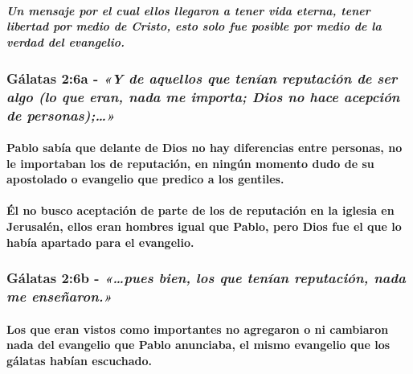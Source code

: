\documentclass[11a pt,twoside]{article}
\newcommand{\scripture}[1]{%
  {\fontsize{12pt}{16pt}\selectfont\ScriptureFont\itshape #1}%
}
\let\oldsubsubsection\subsubsection
\renewcommand{\subsubsection}{\needspace{4\baselineskip}\oldsubsubsection}
\let\oldparagraph\paragraph
\renewcommand{\paragraph}{\needspace{3\baselineskip}\oldparagraph}
\let\oldsubparagraph\subparagraph
\renewcommand{\subparagraph}{\needspace{2\baselineskip}\oldsubparagraph}
\begin{document}
\subparagraph{Un mensaje por el cual ellos llegaron a tener vida eterna,
tener libertad por medio de Cristo, esto solo fue posible por medio de
la verdad del
evangelio.}\label{un-mensaje-por-el-cual-ellos-llegaron-a-tener-vida-eterna-tener-libertad-por-medio-de-cristo-esto-solo-fue-posible-por-medio-de-la-verdad-del-evangelio.}

\subsubsection{\texorpdfstring{Gálatas 2:6a -
\scripture{«Y de aquellos que tenían reputación de ser algo (lo que eran, nada me importa; Dios no hace acepción de personas);…»}}{Gálatas 2:6a - }}\label{guxe1latas-26a---y-de-aquellos-que-tenuxedan-reputaciuxf3n-de-ser-algo-lo-que-eran-nada-me-importa-dios-no-hace-acepciuxf3n-de-personas}

\paragraph{Pablo sabía que delante de Dios no hay diferencias entre
personas, no le importaban los de reputación, en ningún momento dudo de
su apostolado o evangelio que predico a los
gentiles.}\label{pablo-sabuxeda-que-delante-de-dios-no-hay-diferencias-entre-personas-no-le-importaban-los-de-reputaciuxf3n-en-ninguxfan-momento-dudo-de-su-apostolado-o-evangelio-que-predico-a-los-gentiles.}

\paragraph{Él no busco aceptación de parte de los de reputación en la
iglesia en Jerusalén, ellos eran hombres igual que Pablo, pero Dios fue
el que lo había apartado para el
evangelio.}\label{uxe9l-no-busco-aceptaciuxf3n-de-parte-de-los-de-reputaciuxf3n-en-la-iglesia-en-jerusaluxe9n-ellos-eran-hombres-igual-que-pablo-pero-dios-fue-el-que-lo-habuxeda-apartado-para-el-evangelio.}

\subsubsection{\texorpdfstring{Gálatas 2:6b -
\scripture{«…pues bien, los que tenían reputación, nada me enseñaron.»}}{Gálatas 2:6b - }}\label{guxe1latas-26b---pues-bien-los-que-tenuxedan-reputaciuxf3n-nada-me-enseuxf1aron.}

\paragraph{Los que eran vistos como importantes no agregaron o ni
cambiaron nada del evangelio que Pablo anunciaba, el mismo evangelio que
los gálatas habían
escuchado.}\label{los-que-eran-vistos-como-importantes-no-agregaron-o-ni-cambiaron-nada-del-evangelio-que-pablo-anunciaba-el-mismo-evangelio-que-los-guxe1latas-habuxedan-escuchado.}
\end{document}
